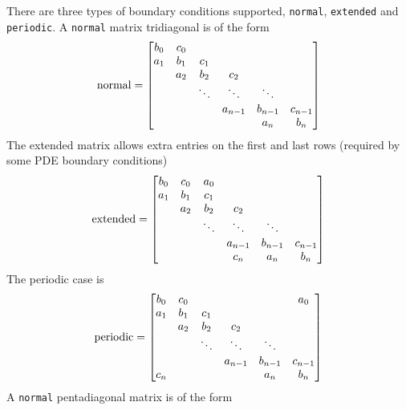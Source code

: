 There are three types of boundary conditions supported, {\tt normal}, {\tt extended} and
{\tt periodic}. 
A {\tt normal} matrix tridiagonal is of the form
\[
  {\rm normal } = 
        \begin{bmatrix}
               b_0 & c_0 &      &        &        &     \\
               a_1 & b_1 & c_1  &        &        &     \\
                   & a_2 & b_2  & c_2    &        &     \\
                   &     &\ddots&\ddots  & \ddots &      \\ 
                   &     &      & a_{n-1}& b_{n-1} & c_{n-1} \\
                   &     &      &        & a_n     & b_n 
        \end{bmatrix}
\]
The extended matrix allows extra entries on the first and last rows (required
by some PDE boundary conditions)
\[
  {\rm extended} = 
        \begin{bmatrix}
               b_0 & c_0 & a_0  &        &        &     \\
               a_1 & b_1 & c_1  &        &        &     \\
                   & a_2 & b_2  & c_2    &        &     \\
                   &     &\ddots&\ddots  & \ddots &      \\ 
                   &     &      & a_{n-1}& b_{n-1} & c_{n-1} \\
                   &     &      & c_n    & a_n     & b_n 
        \end{bmatrix}
\]
The periodic case is
\[
  {\rm periodic } = 
        \begin{bmatrix}
               b_0 & c_0 &      &        &        & a_0 \\
               a_1 & b_1 & c_1  &        &        &     \\
                   & a_2 & b_2  & c_2    &        &     \\
                   &     &\ddots&\ddots  & \ddots &      \\ 
                   &     &      & a_{n-1}& b_{n-1} & c_{n-1} \\
              c_n  &     &      &        & a_n     & b_n 
        \end{bmatrix}
\]
A {\tt normal} pentadiagonal matrix is of the form
